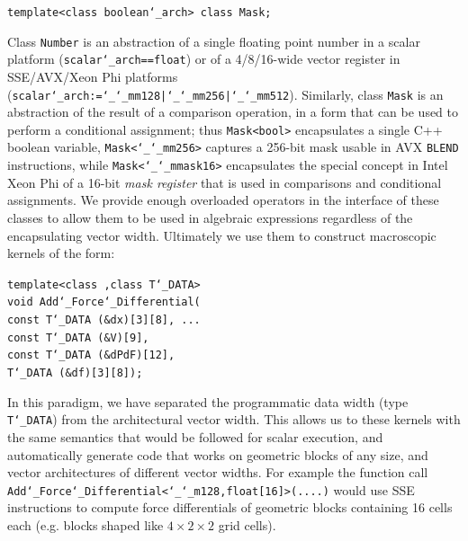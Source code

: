 \begin{shaded}
\texttt{template<class boolean\char`_arch> class Mask;}
\end{shaded}
\vspace*{-.1in} Class \texttt{Number} is an abstraction of a single
floating point number in a scalar platform
(\texttt{scalar\char`_arch==float}) or of a 4/8/16-wide vector
register in SSE/AVX/Xeon Phi platforms
(\texttt{scalar\char`_arch:=\char`_\char`_mm128|\char`_\char`_mm256|\char`_\char`_mm512}). Similarly,
class \texttt{Mask} is an abstraction of the result of a comparison
operation, in a form that can be used to perform a conditional
assignment; thus \texttt{Mask<bool>} encapsulates a single C++ boolean
variable, \texttt{Mask<\char`_\char`_mm256>} captures a 256-bit mask
usable in AVX \texttt{BLEND} instructions, while
\texttt{Mask<\char`_\char`_mmask16>} encapsulates the special concept
in Intel Xeon Phi of a 16-bit \emph{mask register} that is used in
comparisons and conditional assignments. We provide enough overloaded
operators in the interface of these classes to allow them to be used
in algebraic expressions regardless of the encapsulating vector
width. Ultimately we use them to construct macroscopic kernels of the
form:

\begin{shaded}
\texttt{template<class ,class T\char`_DATA>}\\
\texttt{void Add\char`_Force\char`_Differential(}\\
\texttt{\hspace*{2em}const T\char`_DATA (\&dx)[3][8], ...}\\
\texttt{\hspace*{2em}const T\char`_DATA (\&V)[9],}\\
\texttt{\hspace*{2em}const T\char`_DATA (\&dPdF)[12],}\\
\texttt{\hspace*{2em}T\char`_DATA (\&df)[3][8]);}
\end{shaded}

\vspace*{-.1in} In this paradigm, we have separated the programmatic
data width (type
\texttt{T\char`_DATA}) from the architectural vector width. This allows us
to these kernels with the same
semantics that would be followed for scalar execution, and
automatically generate code that works on geometric blocks of any
size, and vector architectures of different vector widths. For example
the function call
\texttt{Add\char`_Force\char`_Differential<\char`_\char`_m128,float[16]>(....)}
would use SSE instructions to compute force differentials of geometric
blocks containing 16 cells each (e.g. blocks shaped like
$4\times 2\times 2$ grid cells). 



